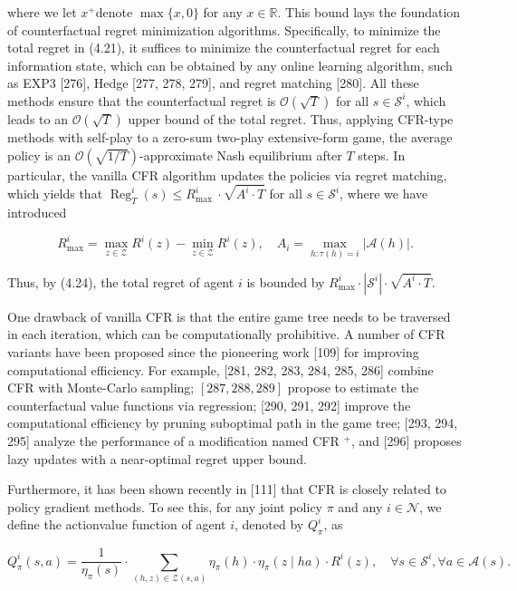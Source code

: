 \documentclass[10pt]{article}
\begin{document}
where we let $x^{+}$denote $\max \{x, 0\}$ for any $x \in \mathbb{R}$. This bound lays the foundation of counterfactual regret minimization algorithms. Specifically, to minimize the total regret in (4.21), it suffices to minimize the counterfactual regret for each information state, which can be obtained by any online learning algorithm, such as EXP3 [276], Hedge [277, 278, 279], and regret matching [280]. All these methods ensure that the counterfactual regret is $\mathcal{O}(\sqrt{T})$ for all $s \in \mathcal{S}^{i}$, which leads to an $\mathcal{O}(\sqrt{T})$ upper bound of the total regret. Thus, applying CFR-type methods with self-play to a zero-sum two-play extensive-form game, the average policy is an $\mathcal{O}(\sqrt{1 / T})$-approximate Nash equilibrium after $T$ steps. In particular, the vanilla CFR algorithm updates the policies via regret matching, which yields that $\operatorname{Reg}_{T}^{i}(s) \leq R_{\text {max }}^{i} \cdot \sqrt{A^{i} \cdot T}$ for all $s \in \mathcal{S}^{i}$, where we have introduced

\[
R_{\max }^{i}=\max _{z \in \mathcal{Z}} R^{i}(z)-\min _{z \in \mathcal{Z}} R^{i}(z), \quad A_{i}=\max _{h: \tau(h)=i}|\mathcal{A}(h)| .
\]

Thus, by (4.24), the total regret of agent $i$ is bounded by $R_{\max }^{i} \cdot\left|\mathcal{S}^{i}\right| \cdot \sqrt{A^{i} \cdot T}$.

One drawback of vanilla CFR is that the entire game tree needs to be traversed in each iteration, which can be computationally prohibitive. A number of CFR variants have been proposed since the pioneering work [109] for improving computational efficiency. For example, [281, 282, 283, 284, 285, 286] combine CFR with Monte-Carlo sampling; $[287,288,289]$ propose to estimate the counterfactual value functions via regression; [290, 291, 292] improve the computational efficiency by pruning suboptimal path in the game tree; [293, 294, 295] analyze the performance of a modification named CFR ${ }^{+}$, and [296] proposes lazy updates with a near-optimal regret upper bound.

Furthermore, it has been shown recently in [111] that CFR is closely related to policy gradient methods. To see this, for any joint policy $\pi$ and any $i \in \mathcal{N}$, we define the actionvalue function of agent $i$, denoted by $Q_{\pi}^{i}$, as

\[
Q_{\pi}^{i}(s, a)=\frac{1}{\eta_{\pi}(s)} \cdot \sum_{(h, z) \in \mathcal{Z}(s, a)} \eta_{\pi}(h) \cdot \eta_{\pi}(z \mid h a) \cdot R^{i}(z), \quad \forall s \in \mathcal{S}^{i}, \forall a \in \mathcal{A}(s) .
\]
\end{document}
